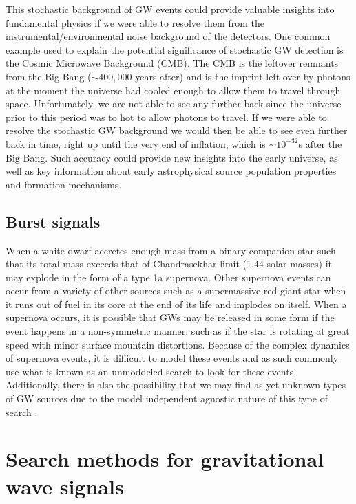 This stochastic background of \ac{GW} events could provide valuable insights into fundamental physics if we were able to resolve them from the instrumental/environmental noise background of the detectors. One common example used to explain the potential significance of stochastic \ac{GW} detection is the Cosmic Microwave Background (CMB). The CMB is the leftover remnants from the Big Bang ($\sim 400,000$ years after) and is the imprint left over by photons at the moment the universe had cooled enough to allow them to travel through space. Unfortunately, we are not able to see any further back since the universe prior to this period was to hot to allow photons to travel. If we were able to resolve the stochastic \ac{GW} background we would then be able to see even further back in time, right up until the very end of inflation, which is $\sim 10^{-32}$s after the Big Bang. Such accuracy could provide new insights into the early universe, as well as key information about early astrophysical source population properties and formation mechanisms. \cite{Romano2017}
 
\subsection{Burst signals}

When a white dwarf accretes enough mass from a binary companion star such that its total mass exceeds that of Chandrasekhar limit (1.44 solar masses) it may explode in the form of a type 1a supernova. Other supernova events can occur from a variety of other sources such as a supermassive red giant star when it runs out of fuel in its core at the end of its life and implodes on itself. When a supernova occurs, it is possible that \ac{GW}s may be released in some form if the event happens in a non-symmetric manner, such as if the star is rotating at great speed with minor surface mountain distortions. Because of the complex dynamics of supernova events, it is difficult to model these events and as such commonly use what is known as an unmoddeled search to look for these events. Additionally, there is also the possibility that we may find as yet unknown types of \ac{GW} sources due to the model independent agnostic nature of this type of search \cite{Sathyaprakash2009}. 

\section{Search methods for gravitational wave signals}

